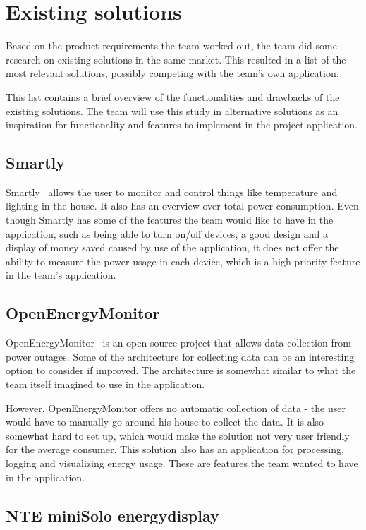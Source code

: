 \section{Existing solutions}
\label{sec:altsolution}
Based on the product requirements the team worked out, the team did some research on existing solutions in the same market. This resulted in a list of the most relevant solutions, possibly competing with the team's own application.
 
This list contains a brief overview of the functionalities and drawbacks of the existing solutions. The team will use this study in alternative solutions as an inspiration for functionality and features to implement in the project application.

\subsection{Smartly}

Smartly~\cite{smartly} allows the user to monitor and control things like temperature and lighting in the house. It also has an overview over total power consumption. Even though Smartly has some of the features the team would like to have in the application, such as being able to turn on/off devices, a good design and a display of money saved caused by use of the application, it does not offer the ability to measure the power usage in each device, which is a high-priority feature in the team's application.

\subsection{OpenEnergyMonitor}

OpenEnergyMonitor~\cite{openenergymonitor} is an open source project that allows data collection from power outages. Some of the architecture for collecting data can be an interesting option to consider if improved. The architecture is somewhat similar to what the team itself imagined to use in the application. 

However, OpenEnergyMonitor offers no automatic collection of data - the user would have to manually go around his house to collect the data. It is also somewhat hard to set up, which would make the solution not very user friendly for the average consumer. This solution also has an application for processing, logging and visualizing energy usage. These are features the team wanted to have in the application.


\subsection{NTE miniSolo energydisplay}

